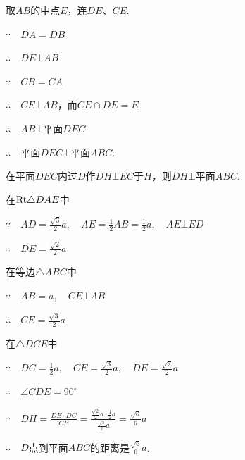 \begin{solution}
取$AB$的中点$E$，连$DE$、$CE$.

\noindent
\begin{minipage}{.5\textwidth}\CTEXindent
$\because\quad    DA=DB$

$\therefore\quad DE\bot AB$

$\because\quad CB=CA$

$\therefore\quad CE\bot AB$，而$CE\cap DE=E$

$\therefore\quad AB\bot$平面$DEC$

$\therefore\quad $平面$DEC\bot $平面$ABC$.

\end{minipage}
\hfill
\begin{minipage}{.45\textwidth}
\centering
{}
\end{minipage}

在平面$DEC$内过$D$作$DH\bot EC$于$H$，则$DH\bot $平面$ABC$.

在${\rm Rt}\triangle DAE$中

$\because\quad AD=\frac{\sqrt{3}}{2}a,\quad AE=\frac{1}{2}AB=\frac{1}{2}a,\quad AE\bot ED$

$\therefore\quad DE=\frac{\sqrt{2}}{2}a$

在等边$\triangle ABC$中

$\because\quad AB=a,\quad CE\bot AB$

$\therefore\quad CE=\frac{\sqrt{3}}{2}a$

在$\triangle DCE$中

$\because\quad DC=\frac{1}{2}a,\quad CE=\frac{\sqrt{3}}{2}a,\quad DE=\frac{\sqrt{2}}{2}a$

$\therefore\quad \angle CDE=90^{\circ}$

$\because\quad DH=\frac{DE\cdot DC}{CE}=\frac{\frac{\sqrt{2}}{2}a\cdot \frac{1}{2}a}{\frac{\sqrt{3}}{2}a}=\frac{\sqrt{6}}{6}a$

$\therefore\quad D$点到平面$ABC$的距离是$\frac{\sqrt{6}}{6}a$.
\end{solution}



